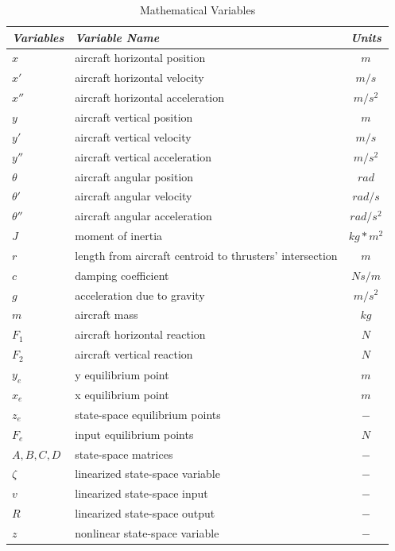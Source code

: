 \documentclass[conference]{IEEEtran}
\begin{document}
\begin{table}[htbp]
\begin{center}
\caption{Mathematical Variables}
\begin{tabular}{|p{2.9cm}|p{4.25cm}|c|}
\hline
\textbf{\textit{Variables}}& \textbf{\textit{Variable Name}}& \textbf{\textit{Units}} \\
\hline
$x$ & aircraft horizontal position & $m$\\
\hline
$x'$ & aircraft horizontal velocity & $m/s$\\
\hline
$x''$ & aircraft horizontal acceleration & $m/s^2$ \\
\hline
$y$ & aircraft vertical position & $m$ \\
\hline
$y'$ & aircraft vertical velocity & $m/s$ \\
\hline
$y''$ & aircraft vertical acceleration & $m/s^2$\\
\hline
$\theta$ & aircraft angular position & $rad$ \\
\hline
$\theta'$ & aircraft angular velocity & $rad/s$ \\
\hline
$\theta''$ & aircraft  angular acceleration & $rad/s^2$\\
\hline
$J$ & moment of inertia & $kg*m^2$ \\
\hline
$r$ & length from aircraft centroid to thrusters' intersection& $m$\\
\hline
$c$ & damping coefficient & $Ns/m$ \\
\hline
$g$ & acceleration due to gravity  & $m/s^2$ \\
\hline
$m$ & aircraft mass & $kg$ \\
\hline
$F_1$ & aircraft horizontal reaction & $N$ \\
\hline
$F_2$ & aircraft vertical reaction & $N$ \\
\hline
$y_e$ & y equilibrium point & $m$ \\
\hline
$x_e$ & x equilibrium point & $m$ \\
\hline
$z_e$ & state-space equilibrium points & $-$ \\
\hline
$F_e$ & input equilibrium points & $N$ \\
\hline
$A,B,C,D$ & state-space matrices & $-$ \\
\hline
$\zeta$ & linearized state-space variable & $-$\\
\hline
$v$ & linearized state-space input & $-$\\
\hline
$R$ & linearized state-space output & $-$\\
\hline
$z$ & nonlinear state-space variable & $-$\\

\end{tabular}
\end{center}
\end{table}
\end{document}
